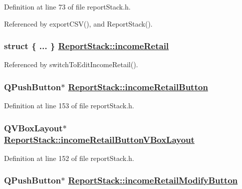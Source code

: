 Definition at line 73 of file report\-Stack.h.

Referenced by export\-CSV(), and Report\-Stack().\hypertarget{classReportStack_r111}{
\subsubsection[incomeRetail]{\setlength{\rightskip}{0pt plus 5cm}struct \{ ... \}   \hyperlink{classReportStack_r111}{Report\-Stack::income\-Retail}}}
\label{classReportStack_r111}




Referenced by switch\-To\-Edit\-Income\-Retail().\hypertarget{classReportStack_r76}{
\subsubsection[incomeRetailButton]{\setlength{\rightskip}{0pt plus 5cm}QPush\-Button$\ast$ \hyperlink{classReportStack_r76}{Report\-Stack::income\-Retail\-Button}}}
\label{classReportStack_r76}


Definition at line 153 of file report\-Stack.h.\hypertarget{classReportStack_r75}{
\subsubsection[incomeRetailButtonVBoxLayout]{\setlength{\rightskip}{0pt plus 5cm}QVBox\-Layout$\ast$ \hyperlink{classReportStack_r75}{Report\-Stack::income\-Retail\-Button\-VBox\-Layout}}}
\label{classReportStack_r75}


Definition at line 152 of file report\-Stack.h.\hypertarget{classReportStack_r74}{
\subsubsection[incomeRetailModifyButton]{\setlength{\rightskip}{0pt plus 5cm}QPush\-Button$\ast$ \hyperlink{classReportStack_r74}{Report\-Stack::income\-Retail\-Modify\-Button}}}
\label{classReportStack_r74}



